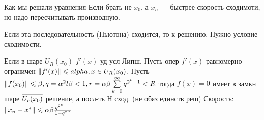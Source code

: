 Как мы решали уравнения
Если брать не $x_0$, а $x_n$ --- быстрее скорость сходимоти, но надо пересчитывать производную.

Если эта последовательность (Ньютона) сходится, то к решению. Нужно условие сходимости.

\theorem{} Если в шаре $U_R(x_0)$ $f'(x)$ уд усл Липш. Пусть опер $f'(x)$ равномерно ограничен $\left\|{f'(x)}\right\|\leqslant alpha, x\in U_R(x_0)$. Пусть $\left\|{f(x_0)}\right\|\leqslant \beta, q = \alpha^2l\beta < 1, r = \alpha\beta\sum\limits_{k=0}^{\infty}q^{2^k-1} < R$
тогда $f(x) = 0$ имеет в замкн шаре $\overline{U_r(x_0)}$ решение, а посл-ть Н сход. (не обяз единств реш)
Скорость: $\left\|{x_n-x^*}\right\| \leqslant \alpha\beta\frac{q^{2^n-1}}{1-q^{2^n}}$